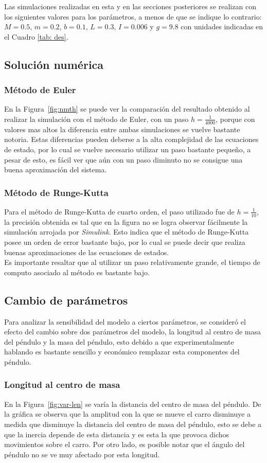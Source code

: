 \documentclass{ieeeaccess}
\begin{document}
Las simulaciones realizadas en esta y en las secciones posteriores se realizan con los siguientes valores para los parámetros, a menos de que se indique lo contrario: $M=0.5$, $m=0.2$, $b=0.1$, $L=0.3$, $I=0.006$ y $g=9.8$ con unidades indicadas en el Cuadro \ref{tab: des}.


\subsection{Solución numérica}
\subsubsection{Método de Euler}
En la Figura~\ref{fig:nmth} se puede ver la comparación del resultado
obtenido al realizar la simulación con el método de Euler, con un
paso $h = \frac{1}{4000}$, porque con valores mas altos
la diferencia entre ambas simulaciones se vuelve bastante notoria.
Estas diferencias pueden deberse a la alta complejidad de las
ecuaciones de estado, por lo cual se vuelve necesario utilizar un
paso bastante pequeño, a pesar de esto, es fácil ver que aún con
un paso diminuto no se consigue una buena aproximación del sistema.
\subsubsection{Método de Runge-Kutta}
Para el método de Runge-Kutta de cuarto orden, el paso utilizado fue
de $h = \frac{1}{10}$, la precisión obtenida es tal que en la figura
no se logra observar fácilmente la simulación arrojada por \textit{Simulink}.
Esto indica que el método de Runge-Kutta posee un orden de error
bastante bajo, por lo cual se puede decir que realiza buenas
aproximaciones de las ecuaciones de estados.\\
Es importante resaltar que al utilizar un paso relativamente grande,
el tiempo de computo asociado al método es bastante bajo.

\subsection{Cambio de parámetros}
Para analizar la sensibilidad del modelo a ciertos parámetros, se
consideró el efecto del cambio sobre dos parámetros del modelo,
la longitud al centro de masa del péndulo y la masa del péndulo,
esto debido a que experimentalmente hablando es bastante sencillo y
económico remplazar esta componentes del péndulo.
\subsubsection{Longitud al centro de masa}
En la Figura~\ref{fig:var-len} se varía la distancia del centro de masa
del péndulo. De la gráfica se observa que la amplitud con la que se
mueve el carro disminuye a medida que disminuye la distancia del centro
de masa del péndulo, esto se debe a que la inercia depende de esta
distancia y es esta la que provoca dichos movimientos sobre el carro.
Por otro lado, es posible notar que el ángulo del péndulo
no se ve muy afectado por esta longitud.
\end{document}
